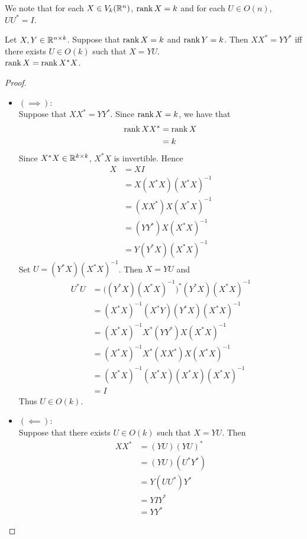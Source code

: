 \documentclass{book}
\begin{document}
	\begin{note}
		We note that for each $X \in V_k(\mathbb{R}^n)$, $\operatorname{rank} X = k$ and for each $U \in O(n)$, $UU^* = I$.
	\end{note}
	
	\begin{ex}
		Let $X, Y \in \mathbb{R}^{n \times k}$. Suppose that $\operatorname{rank} X = k$ and $\operatorname{rank} Y = k$. Then $XX^* = YY^*$ iff there exists $U \in O(k)$ such that $X = YU$. \\
		 $\operatorname{rank} X = \operatorname{rank} X^*X$.
	\end{ex}
	
	\begin{proof}\
		\begin{itemize}
			\item $(\implies)$: \\
			Suppose that $XX^* = YY^*$. Since $\operatorname{rank} X = k$, we have that  
			\begin{align*}
				\operatorname{rank} XX^* 
				& = \operatorname{rank} X \\
				& = k
			\end{align*}
			Since $X^*X \in \mathbb{R}^{k \times k}$, $X^*X$ is invertible. Hence 
			\begin{align*}
				X
				& = XI \\
				& = X(X^*X)(X^*X)^{-1} \\
				& = (XX^*) X (X^*X)^{-1} \\
				& = (YY^*) X (X^*X)^{-1} \\
				& = Y(Y^*X)(X^*X)^{-1}
			\end{align*}
			Set $U =(Y^*X)(X^*X)^{-1}$. Then $X = YU$ and  
			\begin{align*}
				U^*U
				& = \bigg( (Y^*X)(X^*X)^{-1} \bigg)^* (Y^*X)(X^*X)^{-1} \\
				& = (X^*X)^{-1} (X^* Y) (Y^*X) (X^*X)^{-1} \\
				& = (X^*X)^{-1} X^* (YY^*)X (X^*X)^{-1} \\
				& = (X^*X)^{-1} X^* (XX^*)X (X^*X)^{-1} \\
				& = (X^*X)^{-1} (X^* X) (X^*X) (X^*X)^{-1} \\
				& = I
			\end{align*}
			Thus $U \in O(k)$.
			\item $(\impliedby)$: \\
			Suppose that there exists $U \in O(k)$ such that $X = YU$. Then 
			\begin{align*}
				XX^*
				& = (YU) (YU)^* \\
				& = (YU) (U^* Y^*)  \\
				& =  Y (UU^*) Y^* \\
				& = Y I Y^* \\
				& = YY^*
			\end{align*}
		\end{itemize}
	\end{proof}
	
\end{document}

